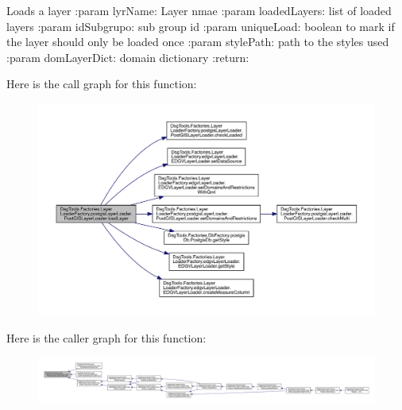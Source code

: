 \begin{DoxyVerb}Loads a layer
:param lyrName: Layer nmae
:param loadedLayers: list of loaded layers
:param idSubgrupo: sub group id
:param uniqueLoad: boolean to mark if the layer should only be loaded once
:param stylePath: path to the styles used
:param domLayerDict: domain dictionary
:return:
\end{DoxyVerb}
 Here is the call graph for this function\+:
\nopagebreak
\begin{figure}[H]
\begin{center}
\leavevmode
\includegraphics[width=350pt]{class_dsg_tools_1_1_factories_1_1_layer_loader_factory_1_1postgis_layer_loader_1_1_post_g_i_s_layer_loader_a5203595a972a1a53441b5f6692b3c028_cgraph}
\end{center}
\end{figure}
Here is the caller graph for this function\+:
\nopagebreak
\begin{figure}[H]
\begin{center}
\leavevmode
\includegraphics[width=350pt]{class_dsg_tools_1_1_factories_1_1_layer_loader_factory_1_1postgis_layer_loader_1_1_post_g_i_s_layer_loader_a5203595a972a1a53441b5f6692b3c028_icgraph}
\end{center}
\end{figure}
\mbox{\label{class_dsg_tools_1_1_factories_1_1_layer_loader_factory_1_1postgis_layer_loader_1_1_post_g_i_s_layer_loader_a80eee9b76693f19791b9ff8fa3c4f805}} 
